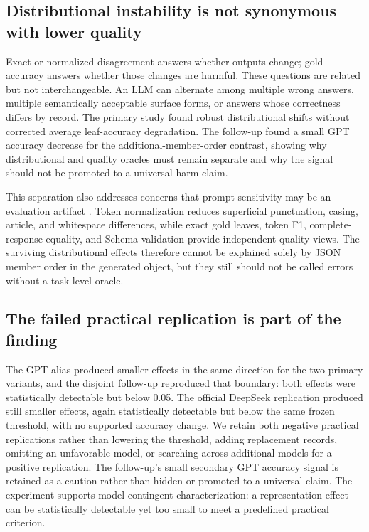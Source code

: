\documentclass[10pt]{article}
\begin{document}
\subsection{Distributional instability is not synonymous with lower quality}
Exact or normalized disagreement answers whether outputs change; gold accuracy answers whether those changes are harmful. These questions are related but not interchangeable. An LLM can alternate among multiple wrong answers, multiple semantically acceptable surface forms, or answers whose correctness differs by record. The primary study found robust distributional shifts without corrected average leaf-accuracy degradation. The follow-up found a small GPT accuracy decrease for the additional-member-order contrast, showing why distributional and quality oracles must remain separate and why the signal should not be promoted to a universal harm claim.

This separation also addresses concerns that prompt sensitivity may be an evaluation artifact \citep{hua2025artifact}. Token normalization reduces superficial punctuation, casing, article, and whitespace differences, while exact gold leaves, token F1, complete-response equality, and Schema validation provide independent quality views. The surviving distributional effects therefore cannot be explained solely by JSON member order in the generated object, but they still should not be called errors without a task-level oracle.

\subsection{The failed practical replication is part of the finding}
The GPT alias produced smaller effects in the same direction for the two primary variants, and the disjoint follow-up reproduced that boundary: both effects were statistically detectable but below 0.05. The official DeepSeek replication produced still smaller effects, again statistically detectable but below the same frozen threshold, with no supported accuracy change. We retain both negative practical replications rather than lowering the threshold, adding replacement records, omitting an unfavorable model, or searching across additional models for a positive replication. The follow-up's small secondary GPT accuracy signal is retained as a caution rather than hidden or promoted to a universal claim. The experiment supports model-contingent characterization: a representation effect can be statistically detectable yet too small to meet a predefined practical criterion.
\end{document}
